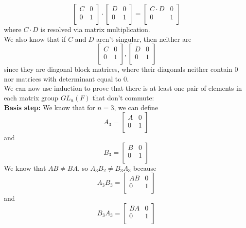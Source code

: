 \documentclass{article}
\begin{document}
    \[ \begin{bmatrix}
        C & 0 \\
        0 & 1 \\
    \end{bmatrix} \cdot
    \begin{bmatrix}
        D & 0 \\
        0 & 1 \\
    \end{bmatrix}
    = \begin{bmatrix}
        C \cdot D & 0 \\
        0 & 1 \\
    \end{bmatrix} \]
    where $C \cdot D$ is resolved via matrix multiplication. \\
    We also know that if $C$ and $D$ aren't singular,
    then neither are
    \[ \begin{bmatrix}
        C & 0 \\
        0 & 1 \\
    \end{bmatrix}, 
    \begin{bmatrix}
        D & 0 \\
        0 & 1 \\
    \end{bmatrix} \]
    since they are diagonal block matrices, where their diagonals neither
    contain 0 nor matrices with determinant equal to 0. \\
    We can now use induction to prove that there is at least one pair of
    elements in each matrix group $GL_n(F)$ that don't commute: \\
    \textbf{Basis step:}
    We know that for $n = 3$, we can define
    \[ A_3 =
    \begin{bmatrix}
    A & 0 \\
    0 & 1 \\
    \end{bmatrix}\]
    and 
    \[ B_3 =
    \begin{bmatrix}
    B & 0 \\
    0 & 1 \\
    \end{bmatrix} \]
    We know that $AB \neq BA$,
    so $A_3B_2 \neq B_3A_3$ because
    \[ A_3B_3 = 
    \begin{bmatrix}
    AB & 0 \\
    0 & 1 \\
    \end{bmatrix}\]
    and 
    \[ B_3A_3 =
    \begin{bmatrix}
    BA & 0 \\
    0 & 1 \\
    \end{bmatrix} \]
\end{document}
